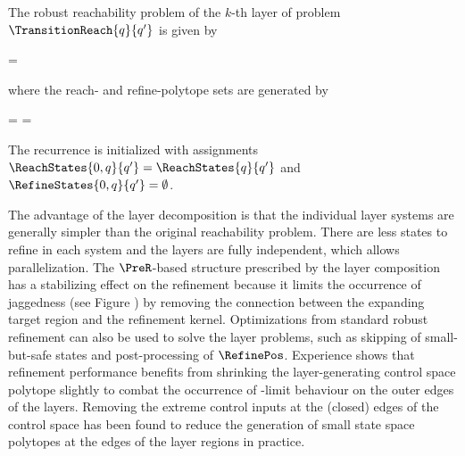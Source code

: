     The robust reachability problem of the $k$-th layer of problem $\TransitionReach{q}{q'}$ is given by

    \startformula
         = 
    \stopformula

    where the reach- and refine-polytope sets are generated by

    \startformula
        \startalign[n=2,align={right,left}]
            \NC {} =
            \NC {} \cup {} \quad\EndAnd
            \NR
            \NC {} =
            \NC {} \EndPeriod
            \NR
        \stopalign
    \stopformula

    The recurrence is initialized with assignments $\ReachStates{0, q}{q'} = \ReachStates{q}{q'}$ and $\RefineStates{0, q}{q'} = \emptyset$.

    The advantage of the layer decomposition is that the individual layer systems are generally simpler than the original reachability problem.
    There are less states to refine in each system and the layers are fully independent, which allows parallelization.
    The $\PreR$-based structure prescribed by the layer composition has a stabilizing effect on the refinement because it limits the occurrence of jaggedness (see Figure ) by removing the connection between the expanding target region and the refinement kernel.
    Optimizations from standard robust refinement can also be used to solve the layer problems, such as skipping of small-but-safe states and post-processing of $\RefinePos$.
    Experience shows that refinement performance benefits from shrinking the layer-generating control space polytope slightly to combat the occurrence of \epsilon-limit behaviour on the outer edges of the layers.
    Removing the extreme control inputs at the (closed) edges of the control space has been found to reduce the generation of small state space polytopes at the edges of the layer regions in practice.

\stopsubsection


\startsubsection[title={Transition Selection},reference=refinement-transition-selection]

